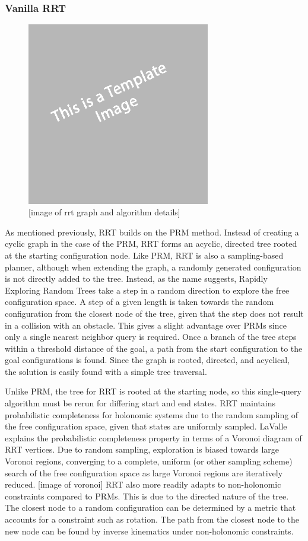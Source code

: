 \documentclass[12pt]{article}
\begin{document}
        \subsubsection{Vanilla RRT}
            \begin{figure}[ht]
                \includegraphics[width=8cm]{temp}
                \centering
                \caption{[image of rrt graph and algorithm details]}
            \end{figure}
            \par As mentioned previously, RRT builds on the PRM method. Instead of creating a cyclic graph in the case of the PRM, RRT forms an acyclic, directed tree rooted at the starting configuration node. Like PRM, RRT is also a sampling-based planner, although when extending the graph, a randomly generated configuration is not directly added to the tree. Instead, as the name suggests, Rapidly Exploring Random Trees take a step in a random direction to explore the free configuration space. A step of a given length is taken towards the random configuration from the closest node of the tree, given that the step does not result in a collision with an obstacle. This gives a slight advantage over PRMs since only a single nearest neighbor query is required. Once a branch of the tree steps within a threshold distance of the goal, a path from the start configuration to the goal configurations is found. Since the graph is rooted, directed, and acyclical, the solution is easily found with a simple tree traversal. 
            \par Unlike PRM, the tree for RRT is rooted at the starting node, so this single-query algorithm must be rerun for differing start and end states. RRT maintains probabilistic completeness for holonomic systems due to the random sampling of the free configuration space, given that states are uniformly sampled. LaValle explains the probabilistic completeness property in terms of a Voronoi diagram of RRT vertices. Due to random sampling, exploration is biased towards large Voronoi regions, converging to a complete, uniform (or other sampling scheme) search of the free configuration space as large Voronoi regions are iteratively reduced. [image of voronoi] RRT also more readily adapts to non-holonomic constraints compared to PRMs. This is due to the directed nature of the tree. The closest node to a random configuration can be determined by a metric that accounts for a constraint such as rotation. The path from the closest node to the new node can be found by inverse kinematics under non-holonomic constraints.
\end{document}
